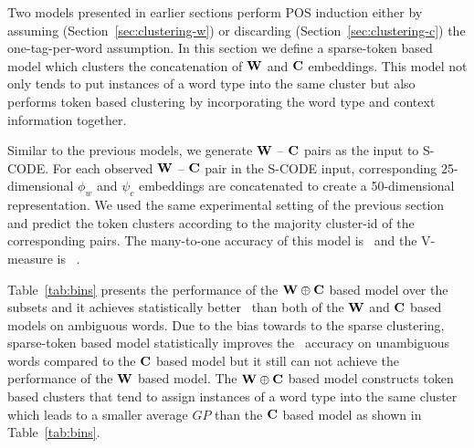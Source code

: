 Two models presented in earlier sections perform POS induction either
by assuming (Section~\ref{sec:clustering-w}) or discarding
(Section~\ref{sec:clustering-c}) the one-tag-per-word assumption.  In
this section we define a sparse-token based model which clusters the
concatenation of ${\bf W}$ and ${\bf C}$ embeddings.  This model not
only tends to put instances of a word type into the same cluster but
also performs token based clustering by incorporating the word type
and context information together.

Similar to the previous models, we generate ${\bf W}$ -- ${\bf C}$
pairs as the input to S-CODE.  For each observed ${\bf W}$ -- ${\bf
  C}$ pair in the S-CODE input, corresponding 25-dimensional $\phi_w$
and $\psi_c$ embeddings are concatenated to create a 50-dimensional
representation.  We used the same experimental setting of the previous
section and predict the token clusters according to the majority
cluster-id of the corresponding pairs.  The many-to-one accuracy of
this model is \wsxymto\ and the V-measure is \wsxyvm\ .

Table~\ref{tab:bins} presents the performance of the ${\bf
  W}\oplus{\bf C}$ based model over the subsets and it achieves
statistically better \mto\ than both of the ${\bf W}$ and ${\bf C}$
based models on ambiguous words.  Due to the bias towards to the
sparse clustering, sparse-token based model statistically improves the
\mto\ accuracy on unambiguous words compared to the ${\bf C}$ based
model but it still can not achieve the performance of the ${\bf W}$
based model.  The ${\bf W}\oplus{\bf C}$ based model constructs token
based clusters that tend to assign instances of a word type into the
same cluster which leads to a smaller average $GP$ than the ${\bf C}$
based model as shown in Table~\ref{tab:bins}.

